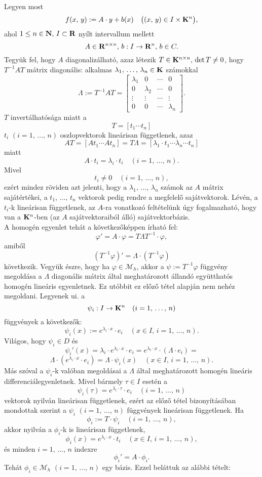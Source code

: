 Legyen most
\[
f(x, \, y) := A \cdot y + b(x) \quad \big( (x, \, y) \in I \times \mathbf{K}^n \big),
\]
ahol $1 \leq n \in \mathbf{N}, \, I \subset \mathbf{R}$ nyílt intervallum mellett
\[
A \in \mathbf{R}^{n \times n}, \, b : I \to \mathbf{R}^n, \, b \in C.
\]
Tegyük fel, hogy $A$ diagonalizálható, azaz létezik $T \in \mathbf{K}^{n \times n}, \, \det T \neq 0$, hogy $T^{-1}AT$ mátrix diagonális: alkalmas $\lambda_1, \, \dots, \, \lambda_n \in \mathbf{K}$ számokkal
\[
\Lambda := T^{-1}AT = \begin{bmatrix}
	\lambda_1 & 0 & \cdots & 0 \\
	0 & \lambda_2 & \cdots & 0 \\
	\vdots & \vdots & \cdots & \vdots \\
	0 & 0 & \cdots & \lambda_n
\end{bmatrix}.
\]
$T$ invertálhatósága miatt a
\[
T = [t_1 \cdots t_n]
\]
$t_i$ $(i=1, \, \dots, \, n)$ oszlopvektorok lineárisan függetlenek, azaz
\[
AT = [At_1 \cdots At_n] = T\Lambda = [\lambda_1 \cdot t_1 \cdots \lambda_n \cdots t_n]
\]
miatt
\[
A \cdot t_i = \lambda_i \cdot t_i \quad (i = 1, \, \dots, \, n).
\]
Mivel
\[
t_i \neq 0 \quad (i = 1, \, \dots, \, n),
\]
ezért mindez röviden azt jelenti, hogy a $\lambda_1, \, \dots, \, \lambda_n$ számok az $A$ mátrix sajátértékei, a $t_1, \, \dots, \, t_n$ vektorok pedig rendre a megfelelő sajátvektorok. Lévén, a $t_i$-k lineárisan függetlenek, az $A$-ra vonatkozó feltételünk úgy fogalmazható, hogy van a $\mathbf{K}^n$-ben (az $A$ sajátvektoraiból álló) sajátvektorbázis.\\

A homogén egyenlet tehát a következőképpen írható fel:
\[
\varphi' = A \cdot \varphi = T \Lambda T^{-1} \cdot \varphi,
\]
amiből
\[
(T^{-1}\varphi)' = \Lambda \cdot (T^{-1} \varphi)
\]
következik. Vegyük észre, hogy ha $\varphi \in \mathcal{M}_h$, akkor a $\psi := T^{-1}\varphi$ függvény megoldása a $\Lambda$ diagonális mátrix által meghatározott állandó együtthatós homogén lineáris egyenletnek. Ez utóbbit ez előző tétel alapján nem nehéz megoldani. Legyenek ui. a
\[
\psi_i : I \to \mathbf{K}^n \quad (i = 1, \, \dots, \, n)
\]
függvények a következők:
\[ 
\psi_i(x) := e^{\lambda_i \cdot x} \cdot e_i \quad (x \in I, \, i = 1, \, \dots, \, n).
\]
Világos, hogy $\psi_i \in D$ és
\[
\psi_i'(x) = \lambda_i \cdot e^{\lambda_i \cdot x} \cdot e_i = e^{\lambda_i \cdot x} \cdot (\Lambda \cdot e_i) =
\]
\[
\Lambda \cdot (e^{\lambda_i \cdot x} \cdot e_i) = \Lambda \cdot \psi_i(x) \quad (x \in I, \, i = 1, \, \dots, \, n).
\]
Más szóval a $\psi_i$-k valóban megoldásai a $\Lambda$ által meghatározott homogén lineáris differenciálegyenletnek. Mivel bármely $\tau \in I$ esetén a
\[
\psi_i(\tau) = e^{\lambda_i \cdot \tau} \cdot e_i \quad (i = 1, \, \dots, \, n)
\]
vektorok nyilván lineárisan függetlenek, ezért az előző tétel bizonyításában mondottak szerint a $\psi_i$ $(i = 1, \, \dots, \, n)$ függvények lineárisan függetlenek. Ha
\[
\phi_i := T \cdot \psi_i \quad (i = 1, \, \dots, \, n),
\]
akkor nyilván a $\phi_i$-k is lineárisan függetlenek,
\[
\phi_i(x) = e^{\lambda_i \cdot x} \cdot t_i \quad (x \in I, \, i = 1, \, \dots, \, n),
\]
és minden $i = 1, \, \dots, \, n$ indexre
\[
\phi_i' = A \cdot \phi_i.
\]
Tehát $\phi_i \in \mathcal{M}_h$ $(i = 1, \, \dots, \, n)$ egy bázis. Ezzel beláttuk az alábbi tételt:\\

